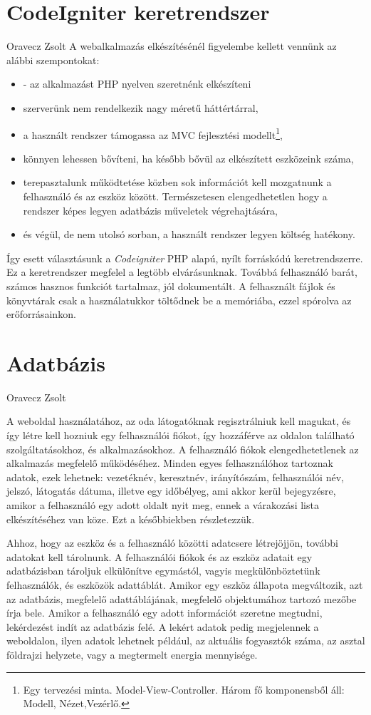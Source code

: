 \documentclass[
]{thesis-ekf}
\theoremstyle{definition}
\theoremstyle{remark}
\begin{document}
	\section{CodeIgniter keretrendszer}
	Oravecz Zsolt
	A webalkalmazás elkészítésénél figyelembe kellett vennünk az alábbi szempontokat:
	\begin{itemize}
		\item -	az alkalmazást PHP nyelven szeretnénk elkészíteni
		\item szerverünk nem rendelkezik nagy méretű háttértárral,
		\item a használt rendszer támogassa az MVC fejlesztési modellt\footnote{Egy tervezési minta. Model-View-Controller. Három fő komponensből áll: Modell, Nézet,Vezérlő.},
		\item könnyen lehessen bővíteni, ha később bővül az elkészített eszközeink száma,
		\item terepasztalunk működtetése közben sok információt kell mozgatnunk a felhasználó és az eszköz között. Természetesen elengedhetetlen hogy a rendszer képes legyen adatbázis műveletek végrehajtására,
		\item és végül, de nem utolsó sorban, a használt rendszer legyen költség hatékony. 
	\end{itemize}
	Így esett választásunk a \emph{Codeigniter} PHP alapú, nyílt forráskódú keretrendszerre. Ez a keretrendszer megfelel a legtöbb elvárásunknak. Továbbá felhasználó barát, számos hasznos funkciót tartalmaz, jól dokumentált. A felhasznált fájlok és könyvtárak csak a használatukkor töltődnek be a memóriába, ezzel spórolva az erőforrásainkon.
	\section{Adatbázis}
	Oravecz Zsolt
	
	A weboldal használatához, az oda látogatóknak regisztrálniuk kell magukat, és így létre kell hozniuk egy felhasználói fiókot, így hozzáférve az oldalon található szolgáltatásokhoz, és alkalmazásokhoz. A felhasználó fiókok elengedhetetlenek az alkalmazás megfelelő működéséhez. Minden egyes felhasználóhoz tartoznak adatok, ezek lehetnek: vezetéknév, keresztnév, irányítószám, felhasználói név, jelszó, látogatás dátuma, illetve egy időbélyeg, ami akkor kerül bejegyzésre, amikor a felhasználó egy adott oldalt nyit meg, ennek a várakozási lista elkészítéséhez van köze. Ezt a későbbiekben részletezzük. 
	
	
	Ahhoz, hogy az eszköz és a felhasználó közötti adatcsere létrejöjjön, további adatokat kell tárolnunk. A felhasználói fiókok és az eszköz adatait egy adatbázisban tároljuk elkülönítve egymástól, vagyis megkülönböztetünk felhasználók, és eszközök adattáblát. 
	Amikor egy eszköz állapota megváltozik, azt az adatbázis, megfelelő adattáblájának, megfelelő objektumához tartozó mezőbe írja bele. Amikor a felhasználó egy adott információt szeretne megtudni, lekérdezést indít az adatbázis felé. A lekért adatok pedig megjelennek a weboldalon, ilyen adatok lehetnek például, az aktuális fogyasztók száma, az asztal földrajzi helyzete, vagy a megtermelt energia mennyisége. 
	
\end{document}
